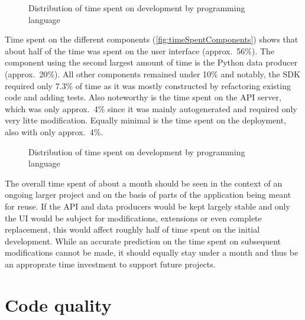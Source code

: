 \begin{figure*}[!ht]
\centering
\hfill
\caption[Distribution of time spent on development]{Distribution of time spent on development by programming language\protect}
\label{fig:timeSpentLanguages}
\end{figure*}

Time spent on the different components (\autoref{fig:timeSpentComponents}) shows that about half of the time was spent on the user interface (approx.~56\%). The component using the second largest amount of time is the Python data producer (approx.~20\%).
All other components remained under 10\% and notably, the \ac{SDK} required only 7.3\% of time as it was mostly constructed by refactoring existing code and adding tests.
Also noteworthy is the time spent on the \ac{API} server, which was only approx.~4\% since it was mainly autogenerated and required only very litte modification.
Equally minimal is the time spent on the deployment, also with only approx.~4\%.

\begin{figure*}[!ht]
\centering
\hfill
\caption[Distribution of time spent on development]{Distribution of time spent on development by programming language\protect}
\label{fig:timeSpentComponents}
\end{figure*}

The overall time spent of about a month should be seen in the context of an ongoing larger project and on the basis of parts of the application being meant for reuse.
If the \ac{API} and data producers would be kept largely stable and only the \ac{UI} would be subject for modifications, extensions or even complete replacement, this would affect roughly half of time spent on the initial development.
While an accurate prediction on the time spent on subsequent modifications cannot be made, it should equally stay under a month and thus be an approprate time investment to support future projects.

\section{Code quality}
\label{sec:code-quality}


